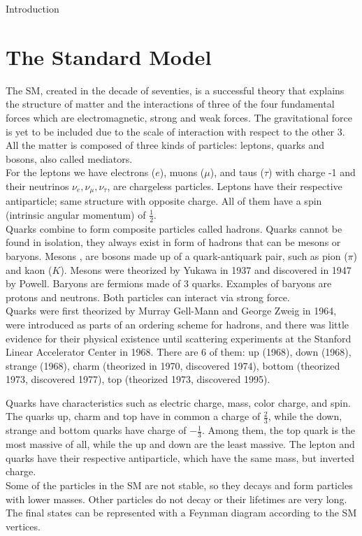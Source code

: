 \begin{chapter}{Introduction}
\section{The Standard Model}  %
The SM, created in the decade of seventies, is a successful theory that explains the structure of matter and the interactions of three of the four fundamental forces which are electromagnetic, strong and weak forces. The gravitational force is yet to be included due to the scale of interaction with respect to the other 3. All the matter is composed of three kinds of particles: leptons, quarks and bosons, also called mediators.\\

For the leptons we have electrons ($e$), muons ($\mu$), and taus ($\tau$) with charge -1 and their neutrinos $\nu_e, \nu_\mu,\nu_\tau$, are chargeless particles. Leptons have their respective antiparticle; same structure with opposite charge. All of them have a spin (intrinsic angular momentum) of $\frac{1}{2}$\cite{griff}.\\

 Quarks combine to form composite particles called hadrons. Quarks cannot be found in isolation, they always exist in form of hadrons that can be mesons or baryons. 
Mesons , are bosons made up of a quark-antiquark pair, such as pion ($\pi$) and kaon ($K$). Mesons were theorized by Yukawa in 1937 and discovered in 1947 by Powell\cite{griff}.
Baryons are fermions made of 3 quarks. Examples of baryons are protons and neutrons. Both particles can interact via strong force.\\
Quarks were first theorized by Murray Gell-Mann and 
George Zweig in 1964, were introduced as parts of an ordering scheme for hadrons, and there was little evidence for their physical existence until scattering experiments at the Stanford Linear Accelerator Center in 1968\cite{griff}.
There are 6 of them: up (1968), down (1968), strange (1968), charm (theorized in 1970, discovered 1974), bottom (theorized 1973, discovered 1977), top (theorized 1973, discovered 1995).

Quarks have characteristics such as  electric charge, mass, color charge, and spin. The quarks up, charm and top have in common a charge of $\frac{2}{3}$, while the down, strange and bottom quarks have charge of $-\frac{1}{3}$. Among them, the top quark is the most massive of all, while the up and down are the least massive. 
The lepton and quarks have their respective antiparticle, which have the same mass, but inverted charge.\\  
Some of the particles in the SM are not stable, so they decays and form particles with lower masses. Other particles do not decay or their lifetimes are very long. The final states can be represented with a Feynman diagram according to the SM vertices\cite{mark}.


\end{chapter}
